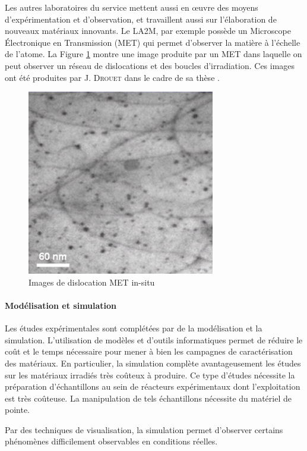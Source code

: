 \documentclass[11pt,class=article,float=false,crop=false]{standalone}
\begin{document}
Les autres laboratoires du service mettent aussi en œuvre des moyens d'expérimentation et d'observation, et travaillent aussi sur l'élaboration de nouveaux matériaux innovants. Le LA2M, par exemple possède un Microscope Électronique en Transmission (MET) qui permet d'observer la matière à l'échelle de l'atome. La Figure \ref{fig:MET} montre une image produite par un MET dans laquelle on peut observer un réseau de dislocations et des boucles d'irradiation. Ces images ont été produites par J. \textsc{Drouet} dans le cadre de sa thèse .

\begin{figure}[H]
  \centering
  \includegraphics[height=0.3\textheight]{img/dislocations-MET}
  \caption[Dislocations au MET]{Images de dislocation MET in-situ }
  \label{fig:MET}
\end{figure}

\paragraph{Modélisation et simulation}
Les études expérimentales sont complétées par de la modélisation et la simulation. L'utilisation de modèles et d'outils informatiques permet de réduire le coût et le temps nécessaire pour mener à bien les campagnes de caractérisation des matériaux. En particulier, la simulation complète avantageusement les études sur les matériaux irradiés très coûteux à produire. Ce type d'études nécessite la préparation d'échantillons au sein de réacteurs expérimentaux dont l'exploitation est très coûteuse. La manipulation de tels échantillons nécessite du matériel de pointe. 

Par des techniques de visualisation, la simulation permet d'observer certains phénomènes difficilement observables en conditions réelles. %
\end{document}
